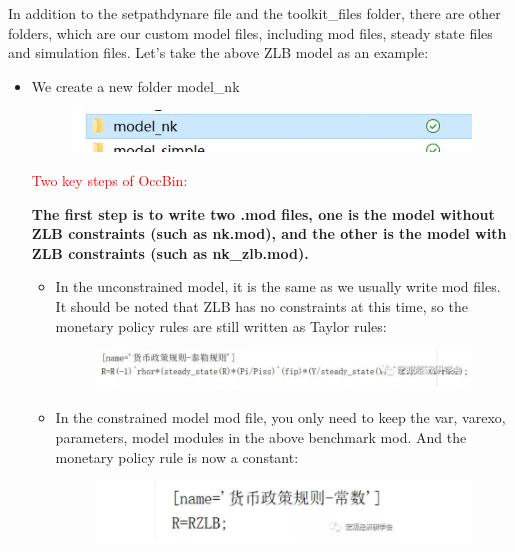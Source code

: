 \documentclass[10pt,math=newtx,citestyle=gb7714-2015,bibstyle=gb7714-2015]{elegantbook}
\begin{document}
{In addition to the setpathdynare file and the toolkit\_files folder, there are other folders, which are our custom model files, including mod files, steady state files and simulation files. Let's take the above ZLB model as an example:

\begin{itemize}
	\item We create a new folder model\_nk
	
	\begin{figure}[htbp!]
		\centering
		\includegraphics[width=0.8\linewidth]{FIG/modelnk}
		\centering
	\end{figure}
	
	\textcolor{red}{Two key steps of OccBin:}
	
	\textbf{The first step is to write two .mod files, one is the model without ZLB constraints (such as nk.mod), and the other is the model with ZLB constraints (such as nk\_zlb.mod).}
	\begin{itemize}
		\item In the unconstrained model, it is the same as we usually write mod files. It should be noted that ZLB has no constraints at this time, so the monetary policy rules are still written as Taylor rules:
		
		\begin{figure}[htbp!]
			\centering
			\includegraphics[width=0.8\linewidth]{FIG/TR}
			\centering
		\end{figure}
		
		\item In the constrained model mod file, you only need to keep the var, varexo, parameters, model modules in the above benchmark mod. And the monetary policy rule is now a constant:
		\begin{figure}[htbp!]
			\centering
			\includegraphics[width=0.8\linewidth]{FIG/TRconstant}
			\centering
		\end{figure}
	\end{itemize}
	

\end{itemize}}
\end{document}
